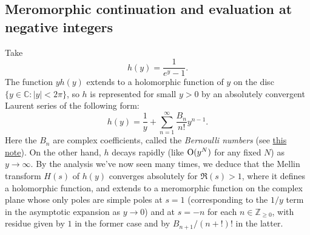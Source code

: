 \documentclass[reqno]{amsart}  \numberwithin{theorem}{section} \numberwithin{equation}{section}
\begin{document}
\subsection{Meromorphic continuation and evaluation at negative integers}
Take
\begin{equation*}
  h(y) = \frac{1}{e^y - 1}.
\end{equation*}
The function $y h(y)$ extends to a holomorphic function of $y$ on the disc $\{y \in \mathbb{C} : \lvert y \rvert < 2 \pi \}$, so $h$ is represented for small $y > 0$ by an absolutely convergent Laurent series of the following form:
\begin{equation*}
  h(y) = \frac{1}{y} + \sum_{n = 1 }^\infty \frac{B_n  }{ n !} y^{n - 1}.
\end{equation*}
Here the $B_n$ are complex coefficients, called the \emph{Bernoulli numbers} (see \href{20230907T144219--bernoulli-numbers-euler-maclaurin.pdf}{this note}).  On the other hand, $h$ decays rapidly (like $\operatorname{O}(y^N)$ for any fixed $N$) as $y \rightarrow \infty$.  By the analysis we've now seen many times, we deduce that the Mellin transform $H(s)$ of $h(y)$ converges absolutely for $\Re(s) > 1$, where it defines a holomorphic function, and extends to a meromorphic function on the complex plane whose only poles are simple poles at $s = 1$ (corresponding to the $1/y$ term in the asymptotic expansion as $y \rightarrow 0$) and at $s = -n$ for each $n \in \mathbb{Z}_{\geq 0}$, with residue given by $1$ in the former case and by $B_{n+1} / (n+!)!$ in the latter.
\end{document}
